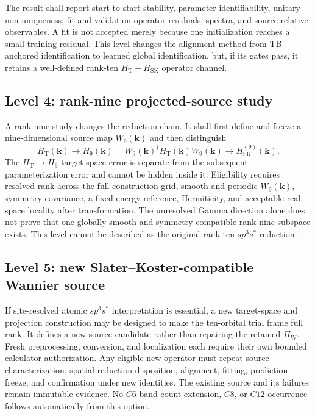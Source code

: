 \documentclass[11pt]{article}
\begin{document}
The result shall report start-to-start stability, parameter identifiability, unitary
non-uniqueness, fit and validation operator residuals, spectra, and source-relative
observables.  A fit is not accepted merely because one initialization reaches a small
training residual.  This level changes the alignment method from TB-anchored
identification to learned global identification, but, if its gates pass, it retains a
well-defined rank-ten $H_{\mathrm{T}}-H_{\mathrm{SK}}$ operator channel.

\subsection{Level 4: rank-nine projected-source study}

A rank-nine study changes the reduction chain.  It shall first define and freeze a
nine-dimensional source map $W_9(\mathbf{k})$ and then distinguish
\begin{equation}
 H_{\mathrm{T}}(\mathbf{k})
 \longrightarrow
 H_9(\mathbf{k})=W_9(\mathbf{k})^{\dagger}
 H_{\mathrm{T}}(\mathbf{k})W_9(\mathbf{k})
 \longrightarrow H_{\mathrm{SK}}^{(9)}(\mathbf{k}).
\end{equation}
The $H_{\mathrm{T}}\rightarrow H_9$ target-space error is separate from the subsequent
parameterization error and cannot be hidden inside it.  Eligibility requires resolved
rank across the full construction grid, smooth and periodic $W_9(\mathbf{k})$, symmetry
covariance, a fixed energy reference, Hermiticity, and acceptable real-space locality
after transformation.  The unresolved Gamma direction alone does not prove that one
globally smooth and symmetry-compatible rank-nine subspace exists.  This level cannot
be described as the original rank-ten $sp^3s^*$ reduction.

\subsection{Level 5: new Slater--Koster-compatible Wannier source}

If site-resolved atomic $sp^3s^*$ interpretation is essential, a new target-space and
projection construction may be designed to make the ten-orbital trial frame full rank.
It defines a new source candidate rather than repairing the retained $H_{\mathrm{W}}$.
Fresh preprocessing, conversion, and localization each require their own bounded
calculator authorization.  Any eligible new operator must repeat source
characterization, spatial-reduction disposition, alignment, fitting, prediction freeze,
and confirmation under new identities.  The existing source and its failures remain
immutable evidence.  No $C6$ band-count extension, $C8$, or $C12$ occurrence follows
automatically from this option.
\end{document}
